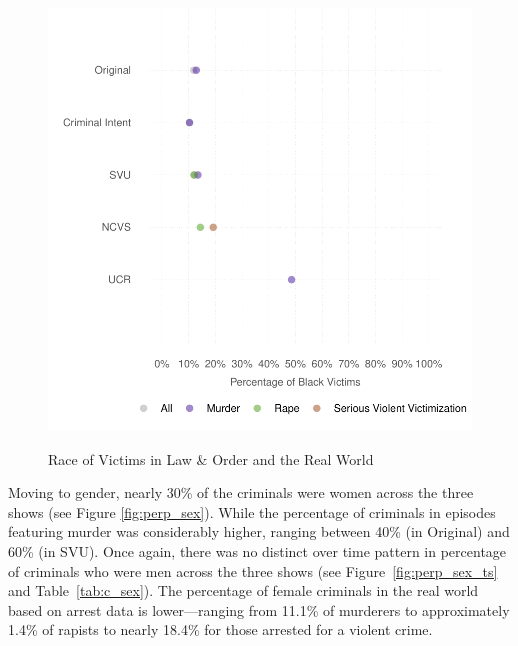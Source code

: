 \documentclass[12pt, letterpaper]{article}
\begin{document}
\begin{figure}[htbp]
\centering
\caption{Race of Victims in Law \& Order and the Real World}
\includegraphics[scale=.9]{../figs/all_victims_by_race.pdf}
\label{fig:victim_race}
\end{figure}

Moving to gender, nearly 30\% of the criminals were women across the three shows (see Figure \ref{fig:perp_sex}). While the percentage of criminals in episodes featuring murder was considerably higher, ranging between 40\% (in Original) and 60\% (in SVU). Once again, there was no distinct over time pattern in percentage of criminals who were men across the three shows (see Figure~\ref{fig:perp_sex_ts} and Table~\ref{tab:c_sex}). The percentage of female criminals in the real world based on arrest data is lower---ranging from 11.1\% of murderers to approximately 1.4\% of rapists to nearly 18.4\% for those arrested for a violent crime. 
\end{document}
